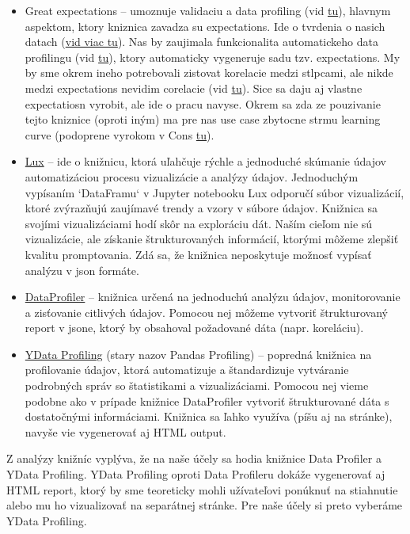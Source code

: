 \begin{itemize}
\item Great expectations -- umoznuje validaciu a data profiling (vid \href{https://legacy.017.docs.greatexpectations.io/docs/0.15.50/}{tu}), hlavnym aspektom, ktory kniznica zavadza su expectations. Ide o tvrdenia o nasich datach (\href{https://legacy.017.docs.greatexpectations.io/docs/0.15.50/#expectations}{vid viac tu}). Nas by zaujimala funkcionalita automatickeho data profilingu (vid \href{https://legacy.017.docs.greatexpectations.io/docs/0.15.50/#automated-data-profiling}{tu}), ktory automaticky vygeneruje sadu tzv. expectations. My by sme okrem ineho potrebovali zistovat korelacie medzi stlpcami, ale nikde medzi expectations nevidim corelacie (vid \href{https://legacy.017.docs.greatexpectations.io/docs/0.15.50/#automated-data-profiling}{tu}). Sice sa daju aj vlastne expectatiosn vyrobit, ale ide o pracu navyse. Okrem sa zda ze pouzivanie tejto kniznice (oproti iným) ma pre nas use case zbytocne strmu learning curve (podoprene vyrokom v Cons \href{https://paul-fry.medium.com/data-profiling-using-great-expectations-17776f140cdc#59d3}{tu}).

\item \href{https://github.com/lux-org/lux}{Lux} -- ide o knižnicu, ktorá uľahčuje rýchle a jednoduché skúmanie údajov automatizáciou procesu vizualizácie a analýzy údajov. Jednoduchým vypísaním `DataFramu` v Jupyter notebooku Lux odporučí súbor vizualizácií, ktoré zvýrazňujú zaujímavé trendy a vzory v súbore údajov. Knižnica sa svojími vizualizáciami hodí skôr na exploráciu dát. Naším cieľom nie sú vizualizácie, ale získanie štrukturovaných informácií, ktorými môžeme zlepšiť kvalitu promptovania. Zdá sa, že knižnica neposkytuje možnosť vypísať analýzu v json formáte. 

\item \href{https://github.com/capitalone/DataProfiler}{DataProfiler} -- knižnica určená na jednoduchú analýzu údajov, monitorovanie a zisťovanie citlivých údajov. Pomocou nej môžeme vytvoriť štrukturovaný report v jsone, ktorý by obsahoval požadované dáta (napr. koreláciu).

\item \href{https://docs.profiling.ydata.ai/latest/}{YData Profiling} (stary nazov Pandas Profiling) -- popredná knižnica na profilovanie údajov, ktorá automatizuje a štandardizuje vytváranie podrobných správ so štatistikami a vizualizáciami. Pomocou nej vieme podobne ako v prípade knižnice DataProfiler vytvoriť štrukturované dáta s dostatočnými informáciami. Knižnica sa ľahko využíva (píšu aj na stránke), navyše vie vygenerovať aj HTML output.
\end{itemize}

Z analýzy knižníc vyplýva, že na naše účely sa hodia knižnice Data Profiler a YData Profiling. YData Profiling oproti Data Profileru dokáže vygenerovať aj HTML report, ktorý by sme teoreticky mohli užívateľovi ponúknuť na stiahnutie alebo mu ho vizualizovať na separátnej stránke. Pre naše účely si preto vyberáme YData Profiling.

